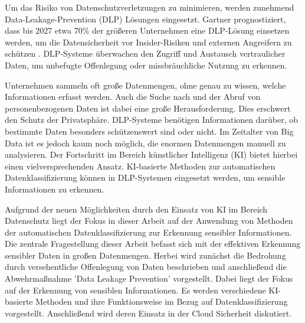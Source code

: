 Um das Risiko von Datenschutzverletzungen zu minimieren, werden zunehmend Data-Leakage-Prevention (DLP) Lösungen eingesetzt. Gartner prognostiziert, dass bis 2027 etwa 70\% der größeren Unternehmen eine DLP-Lösung einsetzen werden, um die Datensicherheit vor Insider-Risiken und externen Angreifern zu schützen \cite{Chugh.2023}. DLP-Systeme überwachen den Zugriff und Austausch vertraulicher Daten, um unbefugte Offenlegung oder missbräuchliche Nutzung zu erkennen.

Unternehmen sammeln oft große Datenmengen, ohne genau zu wissen, welche Informationen erfasst werden. Auch die Suche nach und der Abruf von personenbezogenen Daten ist dabei eine große Herausforderung. Dies erschwert den Schutz der Privatsphäre. DLP-Systeme benötigen Informationen darüber, ob bestimmte Daten besonders schützenswert sind oder nicht. Im Zeitalter von Big Data ist es jedoch kaum noch möglich, die enormen Datenmengen manuell zu analysieren. Der Fortschritt im Bereich künstlicher Intelligenz (KI) bietet hierbei einen vielversprechenden Ansatz. KI-basierte Methoden zur automatischen Datenklassifizierung können in DLP-Systemen eingesetzt werden, um sensible Informationen zu erkennen.

Aufgrund der neuen Möglichkeiten durch den Einsatz von KI im Bereich Datenschutz liegt der Fokus in dieser Arbeit auf der Anwendung von Methoden der automatischen Datenklassifizierung zur Erkennung sensibler Informationen. Die zentrale Fragestellung dieser Arbeit befasst sich mit der effektiven Erkennung sensibler Daten in großen Datenmengen. Herbei wird zunächst die Bedrohung durch versehentliche Offenlegung von Daten beschrieben und anschließend die Abwehrmaßnahme 'Data Leakage Prevention' vorgestellt. Dabei liegt der Fokus auf der Erkennung von sensiblen Informationen. Es werden verschiedene KI-basierte Methoden und ihre Funktionsweise im Bezug auf Datenklassifizierung vorgestellt. Anschließend wird deren Einsatz in der Cloud Sicherheit diskutiert.